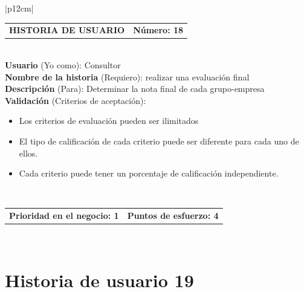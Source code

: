 \documentclass[11pt,letterpaper]{report}
\begin{document}
	\begin{center}	
		\begin{tabular}{|p{12cm}|}
			\hline
			\begin{tabular}{c|c}
				\textbf{HISTORIA DE USUARIO} & \textbf{Número: 18} \\
			\end{tabular} \\ \hline
			\textbf{Usuario} (Yo como): Consultor \\ \hline
			\textbf{Nombre de la historia} (Requiero): realizar una evaluación final \\ \hline
			\textbf{Descripción} (Para): Determinar la nota final de cada grupo-empresa \\ \hline
			\textbf{Validación} (Criterios de aceptación): \\
			\begin{minipage}{12cm}
				\begin{itemize}
					\item Los criterios de evaluación pueden ser ilimitados
					\item El tipo de calificación de cada criterio puede ser diferente para cada uno de ellos.
					\item Cada criterio puede tener un porcentaje de calificación independiente.
				\end{itemize}
			\end{minipage} \\ \hline
			\begin{tabular}{c|c}
				\textbf{Prioridad en el negocio: 1} & \textbf{Puntos de esfuerzo: 4} \\
			\end{tabular} \\ \hline
		\end{tabular}
	\end{center}
	
	\section{Historia de usuario 19}	
	
\end{document}
